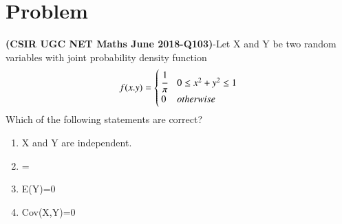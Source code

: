 \documentclass[journal,12pt,twocolumn]{IEEEtran}
\begin{document}
\section*{\textbf{Problem}}
\textbf{(CSIR UGC NET Maths June 2018-Q103)}-Let X and Y be two random variables with joint probability density function
\begin{align*}
    f(x.y)=
    \begin{cases}
    \cfrac{1}{\pi} & 0\le x^2 + y^2 \le 1\\
    0 & otherwise
    \end{cases}
\end{align*}
Which of the following statements are correct?
\begin{enumerate}
    \item
    X and Y are independent.
    
    \item
    =
    
    \item
    E(Y)=0
    
    \item
    Cov(X,Y)=0
\end{enumerate}
\end{document}
